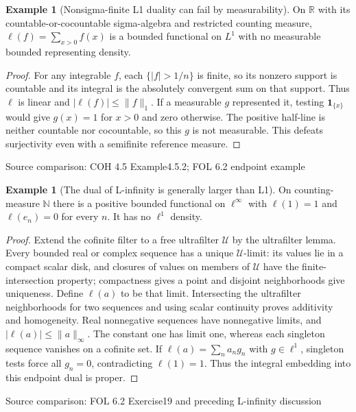 \documentclass[11pt,oneside,openany]{book}
\theoremstyle{definition}
\newtheorem{example}[theorem]{Example}
\theoremstyle{remark}
\newcommand{\R}{\mathbb R}\newcommand{\C}{\mathbb C}
\newcommand{\N}{\mathbb N}\newcommand{\Z}{\mathbb Z}\newcommand{\Q}{\mathbb Q}
\newcommand{\one}{\mathbf1}\newcommand{\ind}[1]{\mathbf1_{#1}}
\newcommand{\family}[1]{}
\newcommand{\source}[1]{\par\begingroup\small\sffamily\color{black!65}Source comparison: #1\par\endgroup}
\begin{document}
\begin{example}[Nonsigma-finite L1 duality can fail by measurability]\family{D11.20.endpoint_surjectivity_failure}\label{d11:20:endpoint-surjectivity-failure}
On $\R$ with its countable-or-cocountable sigma-algebra and restricted counting measure, $\ell(f)=\sum_{x>0}f(x)$ is a bounded functional on $L^1$ with no measurable bounded representing density.
\end{example}
\begin{proof}
For any integrable $f$, each $\{|f|>1/n\}$ is finite, so its nonzero support is countable and its integral is the absolutely convergent sum on that support. Thus $\ell$ is linear and $|\ell(f)|\le\|f\|_1$. If a measurable $g$ represented it, testing $\one_{\{x\}}$ would give $g(x)=1$ for $x>0$ and zero otherwise. The positive half-line is neither countable nor cocountable, so this $g$ is not measurable. This defeats surjectivity even with a semifinite reference measure.
\end{proof}
\source{COH 4.5 Example4.5.2; FOL 6.2 endpoint example}

\begin{example}[The dual of L-infinity is generally larger than L1]\family{D11.20.linfinity_dual_boundary}\label{d11:20:linfinity-dual-boundary}
On counting-measure $\N$ there is a positive bounded functional on $\ell^\infty$ with $\ell(1)=1$ and $\ell(e_n)=0$ for every $n$. It has no $\ell^1$ density.
\end{example}
\begin{proof}
Extend the cofinite filter to a free ultrafilter $\mathcal U$ by the ultrafilter lemma. Every bounded real or complex sequence has a unique $\mathcal U$-limit: its values lie in a compact scalar disk, and closures of values on members of $\mathcal U$ have the finite-intersection property; compactness gives a point and disjoint neighborhoods give uniqueness. Define $\ell(a)$ to be that limit. Intersecting the ultrafilter neighborhoods for two sequences and using scalar continuity proves additivity and homogeneity. Real nonnegative sequences have nonnegative limits, and $|\ell(a)|\le\|a\|_\infty$. The constant one has limit one, whereas each singleton sequence vanishes on a cofinite set. If $\ell(a)=\sum_na_ng_n$ with $g\in\ell^1$, singleton tests force all $g_n=0$, contradicting $\ell(1)=1$. Thus the integral embedding into this endpoint dual is proper.
\end{proof}
\source{FOL 6.2 Exercise19 and preceding L-infinity discussion}
\end{document}

